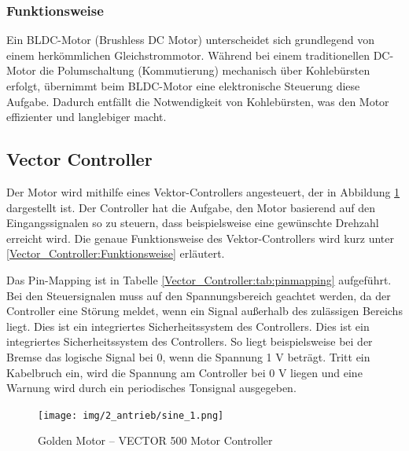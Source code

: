 \pagebreak[4]



\subsubsection{Funktionsweise}
\label{BLDC_Motor:Funktionsweise}
Ein BLDC-Motor (Brushless DC Motor) unterscheidet sich grundlegend von einem herkömmlichen Gleichstrommotor. Während bei einem traditionellen DC-Motor die Polumschaltung (Kommutierung) mechanisch über Kohlebürsten erfolgt, übernimmt beim BLDC-Motor eine elektronische Steuerung diese Aufgabe. Dadurch entfällt die Notwendigkeit von Kohlebürsten, was den Motor effizienter und langlebiger macht\cite{mathworks:bldc_motor}.
\newpage



\subsection{Vector Controller}
\label{section:Vector_Controller}

Der Motor wird mithilfe eines Vektor-Controllers angesteuert, der in Abbildung \ref{Vector_Controller:img:Antrieb_Controller} dargestellt ist. Der Controller hat die Aufgabe, den Motor basierend auf den Eingangssignalen so zu steuern, dass beispielsweise eine gewünschte Drehzahl erreicht wird. Die genaue Funktionsweise des Vektor-Controllers wird kurz unter \ref{Vector_Controller:Funktionsweise} erläutert.

Das Pin-Mapping ist in Tabelle \ref{Vector_Controller:tab:pinmapping} aufgeführt. Bei den Steuersignalen muss auf den Spannungsbereich geachtet werden, da der Controller eine Störung meldet, wenn ein Signal außerhalb des zulässigen Bereichs liegt. Dies ist ein integriertes Sicherheitssystem des Controllers. Dies ist ein integriertes Sicherheitssystem des Controllers. So liegt beispielsweise bei der Bremse das logische Signal bei 0, wenn die Spannung 1 V beträgt. Tritt ein Kabelbruch ein, wird die Spannung am Controller bei 0 V liegen und eine Warnung wird durch ein periodisches Tonsignal ausgegeben.


\begin{figure}[!ht]
	\begin{center}
		\texttt{[image: img/2\_antrieb/sine\_1.png]}
		\caption{Golden Motor – VECTOR 500 Motor Controller}
		\label{Vector_Controller:img:Antrieb_Controller}
	\end{center}
\end{figure}

